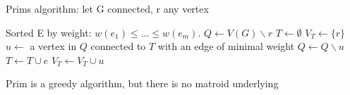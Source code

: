 \documentclass{article}
\theoremstyle{definition}
\theoremstyle{remark}
\begin{document}
\begin{algorithm}
    Prims algorithm: let G connected, r any vertex
    \begin{algorithmic}
    \Require Sorted E by weight: $w(e_1) \leq ... \leq w(e_m)$.
    \State $Q \gets V(G)\backslash r$
    \State $T \gets \emptyset$
    \State $V_T \gets \{r\}$
        \State $u \gets$ a vertex in $Q$ connected to $T$ with an edge of minimal weight
        \State $Q \gets Q \backslash u$
        \State $T \gets T \cup e$
        \State $V_T \gets V_T \cup u$
    \EndWhile
    \end{algorithmic}
\end{algorithm}
Prim is a greedy algorithm, but there is no matroid underlying
\end{document}
